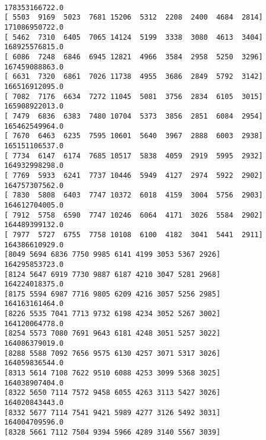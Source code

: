 \documentclass{article}
\begin{document}
    \begin{center}
    \end{center}
    { \hspace*{\fill} \\}
    
    \begin{center}
    \end{center}
    { \hspace*{\fill} \\}
    
    \begin{center}
    \end{center}
    { \hspace*{\fill} \\}
    
    \begin{Verbatim}[commandchars=\\\{\}]
178353166722.0
[ 5503  9169  5023  7681 15206  5312  2208  2400  4684  2814]
171086950722.0
[ 5462  7310  6405  7065 14124  5199  3338  3080  4613  3404]
168925576815.0
[ 6086  7248  6846  6945 12821  4966  3584  2958  5250  3296]
167459088863.0
[ 6631  7320  6861  7026 11738  4955  3686  2849  5792  3142]
166516912095.0
[ 7082  7176  6634  7272 11045  5081  3756  2834  6105  3015]
165908922013.0
[ 7479  6836  6383  7480 10704  5373  3856  2851  6084  2954]
165462549964.0
[ 7670  6463  6235  7595 10601  5640  3967  2888  6003  2938]
165151106537.0
[ 7734  6147  6174  7685 10517  5838  4059  2919  5995  2932]
164932998298.0
[ 7769  5933  6241  7737 10446  5949  4127  2974  5922  2902]
164757307562.0
[ 7830  5808  6403  7747 10372  6018  4159  3004  5756  2903]
164612704005.0
[ 7912  5758  6590  7747 10246  6064  4171  3026  5584  2902]
164489399132.0
[ 7977  5727  6755  7758 10108  6100  4182  3041  5441  2911]
164386610929.0
[8049 5694 6836 7750 9985 6141 4199 3053 5367 2926]
164295853723.0
[8124 5647 6919 7730 9887 6187 4210 3047 5281 2968]
164224018375.0
[8175 5594 6987 7716 9805 6209 4216 3057 5256 2985]
164163161464.0
[8226 5535 7041 7713 9732 6198 4234 3052 5267 3002]
164120064778.0
[8254 5573 7080 7691 9643 6181 4248 3051 5257 3022]
164086379019.0
[8288 5588 7092 7656 9575 6130 4257 3071 5317 3026]
164059836544.0
[8313 5614 7108 7622 9510 6088 4253 3099 5368 3025]
164038907404.0
[8322 5650 7114 7572 9458 6055 4263 3113 5427 3026]
164020843443.0
[8332 5677 7114 7541 9421 5989 4277 3126 5492 3031]
164004709596.0
[8328 5661 7112 7504 9394 5966 4289 3140 5567 3039]
    \end{Verbatim}
\end{document}
